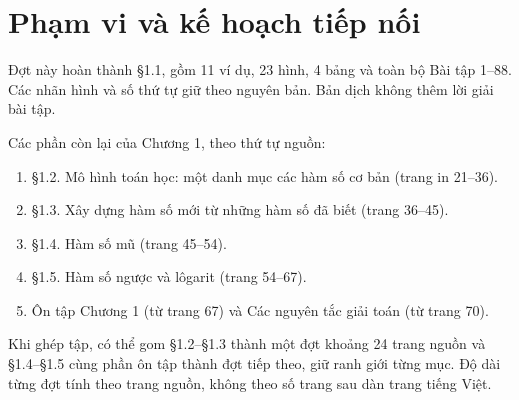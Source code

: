 \documentclass[12pt,a4paper]{article}
\begin{document}
\section*{Phạm vi và kế hoạch tiếp nối}
Đợt này hoàn thành §1.1, gồm 11 ví dụ, 23 hình, 4 bảng và toàn bộ Bài tập 1–88. Các nhãn hình và số thứ tự giữ theo nguyên bản. Bản dịch không thêm lời giải bài tập.

Các phần còn lại của Chương 1, theo thứ tự nguồn:
\begin{enumerate}[nosep]
\item §1.2. Mô hình toán học: một danh mục các hàm số cơ bản (trang in 21–36).
\item §1.3. Xây dựng hàm số mới từ những hàm số đã biết (trang 36–45).
\item §1.4. Hàm số mũ (trang 45–54).
\item §1.5. Hàm số ngược và lôgarit (trang 54–67).
\item Ôn tập Chương 1 (từ trang 67) và Các nguyên tắc giải toán (từ trang 70).
\end{enumerate}
Khi ghép tập, có thể gom §1.2–§1.3 thành một đợt khoảng 24 trang nguồn và §1.4–§1.5 cùng phần ôn tập thành đợt tiếp theo, giữ ranh giới từng mục. Độ dài từng đợt tính theo trang nguồn, không theo số trang sau dàn trang tiếng Việt.
\end{document}
